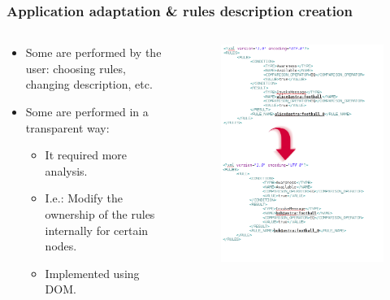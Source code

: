 \begin{frame}

\frametitle{Application adaptation \& rules description creation}

\begin{columns}

	\begin{column}{6cm}
	
	\begin{itemize}
      	\item Some are performed by the user: choosing rules, changing
      	description, etc.
      	\item Some are performed in a transparent way:
		\begin{itemize}
      		\item It required more analysis.
      		\item I.e.: Modify the ownership of the rules internally for certain
      		nodes.
      		\item Implemented using DOM.
        \end{itemize}
        
	\end{itemize}

		
	
	\end{column}
	
		\begin{column}{6cm}
	    
			\begin{figure}
			 	\includegraphics[scale=0.2]{img/rules-transformation.png}
			\end{figure}
	    

\end{column}
\end{columns}
\end{frame}

